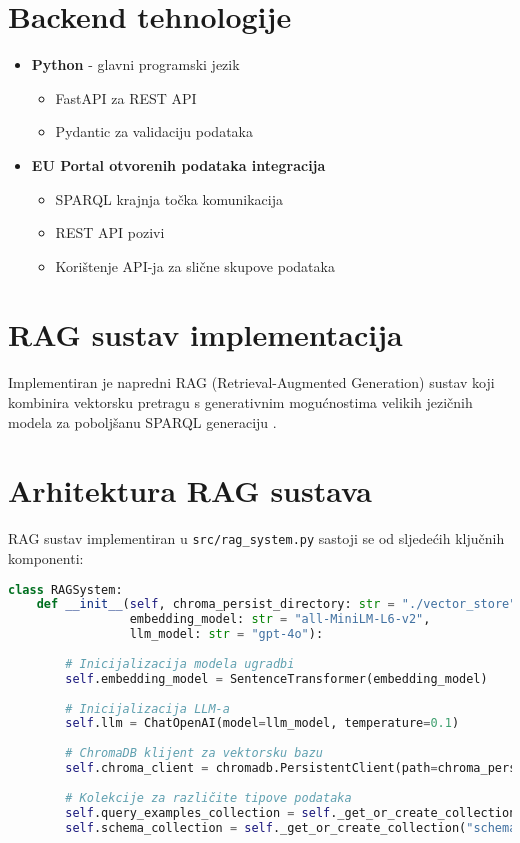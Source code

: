 \section{Backend tehnologije}
\begin{itemize}
    \item \textbf{Python} - glavni programski jezik
    \begin{itemize}
        \item FastAPI za REST API
        \item Pydantic za validaciju podataka
    \end{itemize}
    
    \item \textbf{EU Portal otvorenih podataka integracija}
    \begin{itemize}
        \item SPARQL krajnja točka komunikacija
        \item REST API pozivi
        \item Korištenje API-ja za slične skupove podataka
    \end{itemize}
\end{itemize}

\section{RAG sustav implementacija}
\label{sec:rag_implementation}

Implementiran je napredni RAG (Retrieval-Augmented Generation) sustav koji kombinira vektorsku pretragu s generativnim mogućnostima velikih jezičnih modela za poboljšanu SPARQL generaciju \cite{lewis2020retrieval}.

\section{Arhitektura RAG sustava}
\label{sec:rag_architecture}

RAG sustav implementiran u \texttt{src/rag\_system.py} sastoji se od sljedećih ključnih komponenti:

\begin{lstlisting}[language=Python, caption=Osnovna struktura RAG sustava]
class RAGSystem:
    def __init__(self, chroma_persist_directory: str = "./vector_store",
                 embedding_model: str = "all-MiniLM-L6-v2",
                 llm_model: str = "gpt-4o"):
        
        # Inicijalizacija modela ugradbi
        self.embedding_model = SentenceTransformer(embedding_model)
        
        # Inicijalizacija LLM-a
        self.llm = ChatOpenAI(model=llm_model, temperature=0.1)
        
        # ChromaDB klijent za vektorsku bazu
        self.chroma_client = chromadb.PersistentClient(path=chroma_persist_directory)
        
        # Kolekcije za različite tipove podataka
        self.query_examples_collection = self._get_or_create_collection("query_examples")
        self.schema_collection = self._get_or_create_collection("schema_info")
\end{lstlisting}

